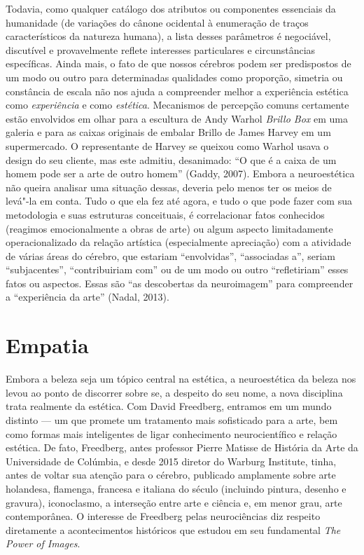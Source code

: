 Todavia, como qualquer catálogo dos atributos ou componentes essenciais
da humanidade (de variações do cânone ocidental à enumeração de traços
característicos da natureza humana), a lista desses parâmetros é
negociável, discutível e provavelmente reflete interesses particulares e
circunstâncias específicas. Ainda mais, o fato de que nossos cérebros
podem ser predispostos de um modo ou outro para determinadas qualidades
como proporção, simetria ou constância de escala não nos ajuda a
compreender melhor a experiência estética como \emph{experiência} e como
\emph{estética}. Mecanismos de percepção comuns certamente estão
envolvidos em olhar para a escultura de Andy Warhol \emph{Brillo Box} em
uma galeria e para as caixas originais de embalar Brillo de James Harvey
em um supermercado. O representante de Harvey se queixou como Warhol
usava o design do seu cliente, mas este admitiu, desanimado: ``O que é a
caixa de um homem pode ser a arte de outro homem'' (Gaddy, 2007). Embora
a neuroestética não queira analisar uma situação dessas, deveria pelo
menos ter os meios de levá"-la em conta. Tudo o que ela fez até agora, e
tudo o que pode fazer com sua metodologia e suas estruturas conceituais,
é correlacionar fatos conhecidos (reagimos emocionalmente a obras de
arte) ou algum aspecto limitadamente operacionalizado da relação
artística (especialmente apreciação) com a atividade de várias áreas do
cérebro, que estariam ``envolvidas'', ``associadas a'', seriam
``subjacentes'', ``contribuiriam com'' ou de um modo ou outro
``refletiriam'' esses fatos ou aspectos. Essas são ``as descobertas da
neuroimagem'' para compreender a ``experiência da arte'' (Nadal, 2013).

\section*{Empatia}

Embora a beleza seja um tópico central na estética, a neuroestética da
beleza nos levou ao ponto de discorrer sobre se, a despeito do seu nome,
a nova disciplina trata realmente da estética. Com David Freedberg,
entramos em um mundo distinto --- um que promete um tratamento mais
sofisticado para a arte, bem como formas mais inteligentes de ligar
conhecimento neurocientífico e relação estética. De fato, Freedberg,
antes professor Pierre Matisse de História da Arte da Universidade de
Colúmbia, e desde 2015 diretor do Warburg Institute, tinha, antes de
voltar sua atenção para o cérebro, publicado amplamente sobre arte
holandesa, flamenga, francesa e italiana do século  (incluindo
pintura, desenho e gravura), iconoclasmo, a interseção entre arte e
ciência e, em menor grau, arte contemporânea. O interesse de Freedberg
pelas neurociências diz respeito diretamente a acontecimentos históricos
que estudou em seu fundamental \emph{The} \emph{Power of Images}.

